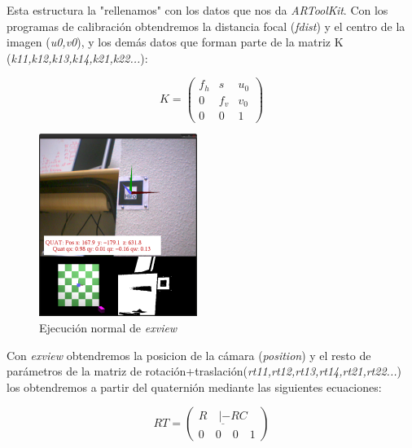 \documentclass[a4paper,12pt,notitlepage,openany]{article}
\begin{document}
Esta estructura la "rellenamos" con los datos que nos da \textit{ARToolKit}. Con los programas de calibraci\'{o}n obtendremos la distancia focal (\textit{fdist}) y el centro de la imagen (\textit{u0,v0}), y los dem\'{a}s datos que forman parte de la matriz K (\textit{k11,k12,k13,k14,k21,k22...}):

\[
K = \left( \begin{array}{lcr}
            f_h     & s   		& u_0  \\
            0     	& f_v   	& v_0  \\
            0				& 0				& 1
           \end{array}
    \right)
\]

\begin{figure}[htb]
	\begin{center}
		\includegraphics{figs/exview2}
	\end{center}
	\caption[Figura 1]{Ejecuci\'{o}n normal de \textit{exview}}
\end{figure}

 Con \textit{exview} obtendremos la posicion de la c\'{a}mara (\textit{position}) y el resto de par\'{a}metros de la matriz de rotaci\'{o}n+traslaci\'{o}n(\textit{rt11,rt12,rt13,rt14,rt21,rt22...}) los obtendremos a partir del quaterni\'{o}n mediante las siguientes ecuaciones:

\[
RT = \left( \begin{array}{l}
							\underline{R \quad | -RC} \\
							0 \quad 0 \quad 0 \quad 1
							\end{array}
			\right)
\]
\end{document}
